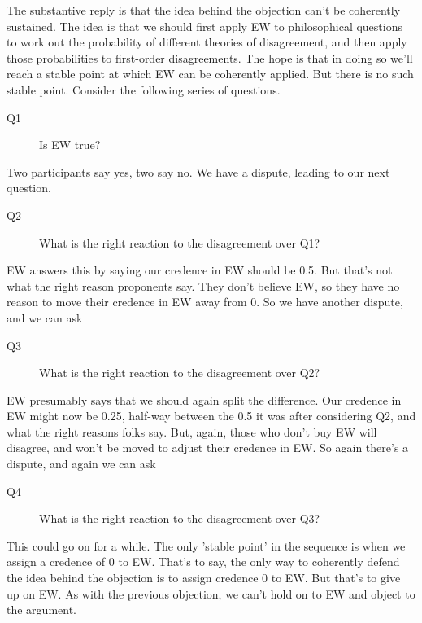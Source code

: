 The substantive reply is that the idea behind the objection can't be coherently sustained. The idea is that we should first apply EW to philosophical questions to work out the probability of different theories of disagreement, and then apply those probabilities to first-order disagreements. The hope is that in doing so we'll reach a stable point at which EW can be coherently applied. But there is no such stable point. Consider the following series of questions.

\begin{description}
\item[Q1] Is EW true?
\end{description}

\noindent Two participants say yes, two say no. We have a dispute, leading to our next question.

\begin{description}
\item[Q2] What is the right reaction to the disagreement over Q1?
\end{description}

\noindent EW answers this by saying our credence in EW should be 0.5. But that's not what the right reason proponents say. They don't believe EW, so they have no reason to move their credence in EW away from 0. So we have another dispute, and we can ask

\begin{description}
\item[Q3] What is the right reaction to the disagreement over Q2?
\end{description}

\noindent EW presumably says that we should again split the difference. Our credence in EW might now be 0.25, half-way between the 0.5 it was after considering Q2, and what the right reasons folks say. But, again, those who don't buy EW will disagree, and won't be moved to adjust their credence in EW. So again there's a dispute, and again we can ask

\begin{description}
\item[Q4] What is the right reaction to the disagreement over Q3?
\end{description}

\noindent This could go on for a while. The only 'stable point' in the sequence is when we assign a credence of 0 to EW. That's to say, the only way to coherently defend the idea behind the objection is to assign credence 0 to EW. But that's to give up on EW. As with the previous objection, we can't hold on to EW and object to the argument.

